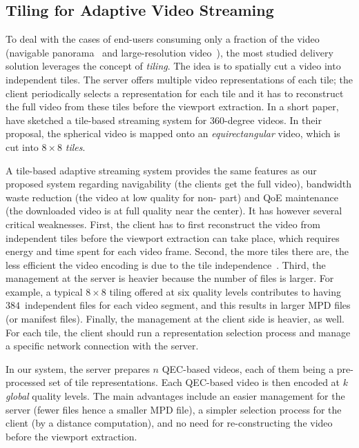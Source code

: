 \subsection{Tiling for Adaptive Video Streaming}
To deal with the cases of end-users consuming only a fraction of the
video (navigable
panorama~\cite{sanchez_compressed_2015,wang_mixing_2014,gaddam_tiling_2015}
and large-resolution video~\cite{jean16mmsys}), the most studied delivery solution
leverages the concept
of \emph{tiling}.
The idea is to
spatially cut a video into independent tiles. The server offers
multiple video representations of each tile; the client periodically
selects a representation for each tile and it has to reconstruct the
full video from these tiles before the viewport extraction.
In a short paper,~\citet{ochi_live_2015} have sketched a
tile-based streaming system for $360$-degree videos. In their proposal,
the spherical video is mapped onto an \emph{equirectangular} video,
which is cut into $8\!\times\! 8$ \emph{tiles}.

A tile-based adaptive streaming system provides the same features as
our proposed system regarding navigability (the clients get the full
video), bandwidth waste reduction (the video at low quality for
non-\FoV{} part) and \ac{QoE} maintenance (the downloaded video is
at full quality near the \FoV{} center). It has however several
critical weaknesses. First, the client has to first reconstruct the
video from independent tiles before the viewport extraction can take
place, which requires energy and time spent for each video frame.
Second, the more tiles there are, the less efficient the video
encoding is due to the tile
independence~\cite{sanchez_compressed_2015}. Third, the management at
the server is heavier because the number of files is larger. For
example, a typical $8\times8$ tiling offered at six quality levels
contributes to having $384$~independent files for each video segment,
and this results in larger \ac{MPD} files (or manifest
files). Finally, the management at the client side is heavier, as
well. For each tile, the client should run a representation selection
process and manage a specific network connection with the server.

In our system, the server
prepares $n$ \ac{QEC}-based videos, each of them being a
pre-processed set of tile representations. Each \ac{QEC}-based video is then
encoded at $k$ \emph{global} quality levels.
The main advantages include
an easier management for the server (fewer files hence a smaller
\ac{MPD} file), a simpler selection process for the client (by a
distance computation), and no need for re-constructing the video before
the viewport extraction.


